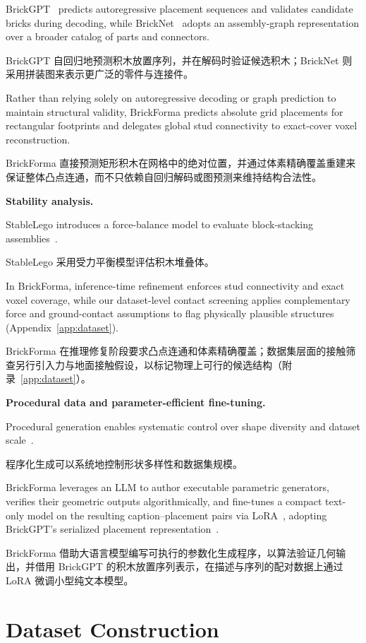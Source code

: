 \documentclass[11pt,letterpaper]{article}
\let\cite\citep
\newcommand{\zh}[1]{{\chinesefont #1}}
\newcommand{\pair}[2]{\par\addvspace{4pt}\noindent
  \begin{minipage}{\linewidth}\raggedright
  #1\par\nobreak\vspace{1pt}
  {\color{translation}\chinesefont\fontsize{10.5}{15.3}\selectfont #2\par}
  \end{minipage}\par}
\newcommand{\readinghead}[2]{\par\addvspace{9pt}\noindent\textbf{#1}\enspace
  {\color{translation}\zh{#2}}\par\nobreak}
\begin{document}
\pair{BrickGPT~\cite{brickgpt} predicts autoregressive placement sequences and validates candidate bricks during decoding, while BrickNet~\cite{bricknet} adopts an assembly-graph representation over a broader catalog of parts and connectors.}{BrickGPT 自回归地预测积木放置序列，并在解码时验证候选积木；BrickNet 则采用拼装图来表示更广泛的零件与连接件。}

\pair{Rather than relying solely on autoregressive decoding or graph prediction to maintain structural validity, BrickForma predicts absolute grid placements for rectangular footprints and delegates global stud connectivity to exact-cover voxel reconstruction.}{BrickForma 直接预测矩形积木在网格中的绝对位置，并通过体素精确覆盖重建来保证整体凸点连通，而不只依赖自回归解码或图预测来维持结构合法性。}

\readinghead{Stability analysis.}{稳定性分析}

\pair{StableLego introduces a force-balance model to evaluate block-stacking assemblies~\cite{stablelego}.}{StableLego 采用受力平衡模型评估积木堆叠体。}

\pair{In BrickForma, inference-time refinement enforces stud connectivity and exact voxel coverage, while our dataset-level contact screening applies complementary force and ground-contact assumptions to flag physically plausible structures (Appendix~\ref{app:dataset}).}{BrickForma 在推理修复阶段要求凸点连通和体素精确覆盖；数据集层面的接触筛查另行引入力与地面接触假设，以标记物理上可行的候选结构（附录~\ref{app:dataset}）。}

\readinghead{Procedural data and parameter-efficient fine-tuning.}{程序化数据与参数高效微调}

\pair{Procedural generation enables systematic control over shape diversity and dataset scale~\cite{infinigen}.}{程序化生成可以系统地控制形状多样性和数据集规模。}

\pair{BrickForma leverages an LLM to author executable parametric generators, verifies their geometric outputs algorithmically, and fine-tunes a compact text-only model on the resulting caption--placement pairs via LoRA~\cite{lora}, adopting BrickGPT's serialized placement representation~\cite{brickgpt}.}{BrickForma 借助大语言模型编写可执行的参数化生成程序，以算法验证几何输出，并借用 BrickGPT 的积木放置序列表示，在描述与序列的配对数据上通过 LoRA 微调小型纯文本模型。}

\section{Dataset Construction\enspace\zh{数据集构建}}
\end{document}
